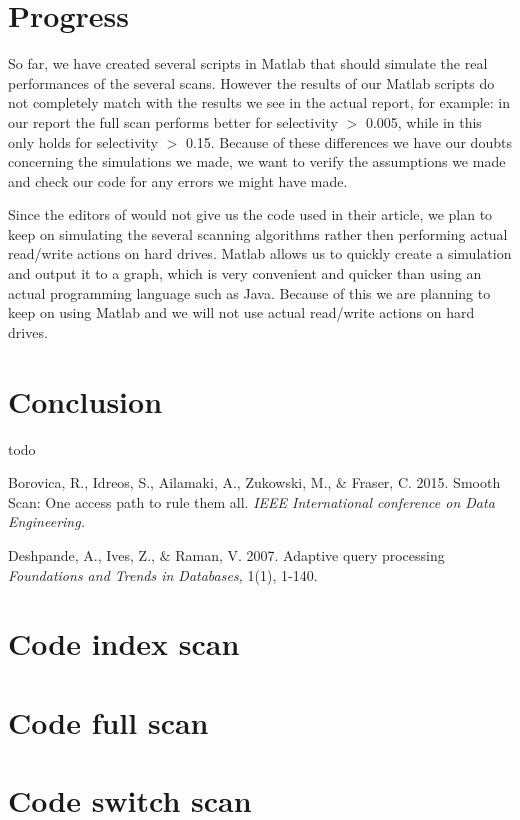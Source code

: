 \documentclass[a4paper,11pt,twoside]{article}
\begin{document}
\section{Progress}
So far, we have created several scripts in Matlab that should simulate the real performances of the several scans. However the results of our Matlab scripts do not completely match with the results we see in the actual report, for example: in our report the full scan performs better for selectivity $>$ 0.005, while in \cite{smoothscan} this only holds for selectivity $>$ 0.15. Because of these differences we have our doubts concerning the simulations we made, we want to verify the assumptions we made and check our code for any errors we might have made.

Since the editors of \cite{smoothscan} would not give us the code used in their article, we plan to keep on simulating the several scanning algorithms rather then performing actual read/write actions on hard drives. Matlab allows us to quickly create a simulation and output it to a graph, which is very convenient and quicker than using an actual programming language such as Java. Because of this we are planning to keep on using Matlab and we will not use actual read/write actions on hard drives.

\section{Conclusion}
todo

\begin{thebibliography}{9}

	 Borovica, R., Idreos, S., Ailamaki, A., Zukowski, M., $\&$ Fraser, C.
	2015.	
 	Smooth Scan: One access path to rule them all.
	\emph{IEEE International conference on Data Engineering.}

	Deshpande, A., Ives, Z., $\&$ Raman, V.
	2007.
	Adaptive query processing
	\emph{Foundations and Trends in Databases,}
	1(1), 1-140.
\end{thebibliography}
\newpage

\begin{appendices}
\section{Code index scan}
\label{appendixa}

\section{Code full scan}
\label{appendixb}

\section{Code switch scan}
\label{appendixc}

\end{appendices}
\end{document}
